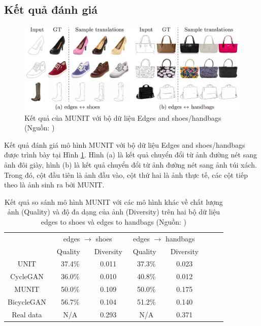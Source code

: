 {    \subsection{Kết quả đánh giá}
    \begin{figure}[H]
    \centering
    \includegraphics[width=12cm] {images/result_munit_edge.png}
    \caption{Kết quả của MUNIT với bộ dữ liệu Edges and shoes/handbags (Nguồn: \cite{munit})}
    \label{fig:result_munit_edge}
    \end{figure}
    
     \noindent Kết quả đánh giá mô hình MUNIT với bộ dữ liệu Edges and shoes/handbags được trình bày tại Hình \ref{fig:result_munit_edge}. Hình (a) là kết quả chuyển đổi từ ảnh đường nét sang ảnh đôi giày, hình (b) là kết quả chuyển đổi từ ảnh đường nét sang ảnh túi xách. Trong đó, cột đầu tiên là ảnh đầu vào, cột thứ hai là ảnh thực tế, các cột tiếp theo là ảnh sinh ra bởi MUNIT.
    
    \begin{table}[H]
        \label{tab_result}
		\addtolength{\tabcolsep}{8pt}
		\renewcommand\arraystretch{1.3}
		\centering
		\small
		\begin{threeparttable}
			\begin{tabular}{|c|c|c|c|c|c|c|c|}
				\hline
				& \multicolumn{2}{c|}{edges $\rightarrow$ shoes} & \multicolumn{2}{c|}{edges $\rightarrow$ handbags} \\  \cline{2-5}
				& \ Quality\ \  & Diversity &  \ Quality\ \  & Diversity \\
				\hline
				UNIT \cite{unit} & 37.4\% & 0.011 & 37.3\%  & 0.023 \\
				CycleGAN \cite{cycle-gan} & 36.0\% & 0.010 & 40.8\% & 0.012 \\
				MUNIT \cite{munit} & 50.0\% & 0.109 & 50.0\% & 0.175 \\
				BicycleGAN \cite{bicyle-gan} & 56.7\%  & 0.104 & 51.2\% & 0.140 \\
				Real data & N/A & 0.293 & N/A & 0.371 \\
				\hline
			\end{tabular}
			\caption{Kết quả so sánh mô hình MUNIT với các mô hình khác về chất lượng ảnh (Quality) và độ đa dạng của ảnh (Diversity) trên hai bộ dữ liệu edges to shoes và edges to handbags (Nguồn: \cite{munit})}
		\end{threeparttable}
	\end{table}
	
}
